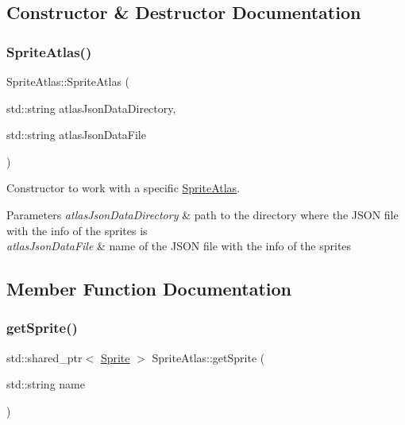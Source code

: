 \subsection{Constructor \& Destructor Documentation}
\hypertarget{class_mason_1_1_sprite_atlas_a7740eb98380f42a0d5b787d44114be8f}{}\label{class_mason_1_1_sprite_atlas_a7740eb98380f42a0d5b787d44114be8f} 
\subsubsection{\texorpdfstring{Sprite\+Atlas()}{SpriteAtlas()}}
{\footnotesize\ttfamily Sprite\+Atlas\+::\+Sprite\+Atlas (\begin{DoxyParamCaption}\item[{std\+::string}]{atlas\+Json\+Data\+Directory,  }\item[{std\+::string}]{atlas\+Json\+Data\+File }\end{DoxyParamCaption})}



Constructor to work with a specific \hyperlink{class_mason_1_1_sprite_atlas}{Sprite\+Atlas}. 


\begin{DoxyParams}{Parameters}
{\em atlas\+Json\+Data\+Directory} & path to the directory where the J\+S\+ON file with the info of the sprites is \\
\hline
{\em atlas\+Json\+Data\+File} & name of the J\+S\+ON file with the info of the sprites \\
\hline
\end{DoxyParams}


\subsection{Member Function Documentation}
\hypertarget{class_mason_1_1_sprite_atlas_a05b230664b024ef23726bfa509da6a40}{}\label{class_mason_1_1_sprite_atlas_a05b230664b024ef23726bfa509da6a40} 
\subsubsection{\texorpdfstring{get\+Sprite()}{getSprite()}}
{\footnotesize\ttfamily std\+::shared\+\_\+ptr$<$ \hyperlink{class_mason_1_1_sprite}{Sprite} $>$ Sprite\+Atlas\+::get\+Sprite (\begin{DoxyParamCaption}\item[{std\+::string}]{name }\end{DoxyParamCaption})}



